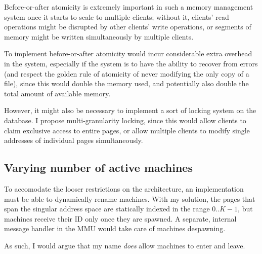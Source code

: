 Before-or-after atomicity is extremely important in such a memory management
system once it starts to scale to multiple clients; without it, clients' read
operations might be disrupted by other clients' write operations, or segments of
memory might be written simultaneously by multiple clients.
\medskip

To implement before-or-after atomicity would incur considerable extra overhead
in the system, especially if the system is to have the ability to recover from
errors (and respect the golden rule of atomicity of never modifying the only
copy of a file), since this would double the memory used, and potentially also
double the total amount of available memory.
\medskip

However, it might also be necessary to implement a sort of locking system on the
database. I propose multi-granularity locking, since this would allow clients to
claim exclusive access to entire pages, or allow multiple clients to modify
single addresses of individual pages simultaneously.

\streg

\subsection{Varying number of active machines}

To accomodate the looser restrictions on the architecture, an implementation
must be able to dynamically rename machines. With my solution, the pages that
span the singular address space are statically indexed in the range $0..K-1$,
but machines receive their ID only once they are spawned. A separate, internal
message handler in the MMU would take care of machines despawning. \medskip

As such, I would argue that my name \textit{does} allow machines to enter and
leave.

\tykstreg
